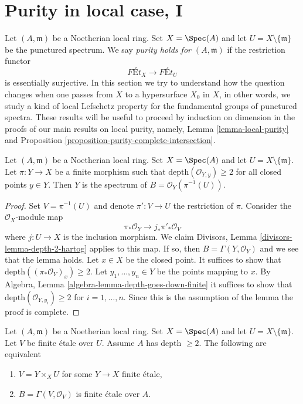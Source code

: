 \section{Purity in local case, I}
\label{section-local-purity}

\noindent
Let $(A, \mathfrak m)$ be a Noetherian local ring. Set $X = \Spec(A)$
and let $U = X \setminus \{\mathfrak m\}$ be the punctured spectrum.
We say {\it purity holds for $(A, \mathfrak m)$} if the restriction functor
$$
\textit{F\'Et}_X \longrightarrow \textit{F\'Et}_U
$$
is essentially surjective. In this section we try to understand how the
question changes when one passes from $X$ to a hypersurface $X_0$ in $X$,
in other words, we study a kind of local Lefschetz property for the
fundamental groups of punctured spectra.
These results will be useful to proceed by induction on dimension
in the proofs of our main results on local purity, namely,
Lemma \ref{lemma-local-purity} and
Proposition \ref{proposition-purity-complete-intersection}.

\begin{lemma}
\label{lemma-sections-over-punctured-spec}
Let $(A, \mathfrak m)$ be a Noetherian local ring. Set $X = \Spec(A)$
and let $U = X \setminus \{\mathfrak m\}$.
Let $\pi : Y \to X$ be a finite morphism such that
$\text{depth}(\mathcal{O}_{Y, y}) \geq 2$ for all closed points
$y \in Y$.
Then $Y$ is the spectrum of $B = \mathcal{O}_Y(\pi^{-1}(U))$.
\end{lemma}

\begin{proof}
Set $V = \pi^{-1}(U)$ and denote $\pi' : V \to U$ the restriction of $\pi$.
Consider the $\mathcal{O}_X$-module map
$$
\pi_*\mathcal{O}_Y \longrightarrow j_*\pi'_*\mathcal{O}_V
$$
where $j : U \to X$ is the inclusion morphism. We claim
Divisors, Lemma \ref{divisors-lemma-depth-2-hartog}
applies to this map. If so, then $B = \Gamma(Y, \mathcal{O}_Y)$
and we see that the lemma holds. Let $x \in X$ be the closed point.
It suffices to show that
$\text{depth}((\pi_*\mathcal{O}_Y)_x) \geq 2$.
Let $y_1, \ldots, y_n \in Y$ be the points mapping to $x$.
By Algebra, Lemma \ref{algebra-lemma-depth-goes-down-finite}
it suffices to show that
$\text{depth}(\mathcal{O}_{Y, y_i}) \geq 2$ for $i = 1, \ldots, n$.
Since this is the assumption of the lemma the proof is complete.
\end{proof}

\begin{lemma}
\label{lemma-reformulate-purity}
Let $(A, \mathfrak m)$ be a Noetherian local ring. Set $X = \Spec(A)$
and let $U = X \setminus \{\mathfrak m\}$.
Let $V$ be finite \'etale
over $U$. Assume $A$ has depth $\geq 2$. The following are equivalent
\begin{enumerate}
\item $V = Y \times_X U$ for some $Y \to X$ finite \'etale,
\item $B = \Gamma(V, \mathcal{O}_V)$ is finite \'etale over $A$.
\end{enumerate}
\end{lemma}

